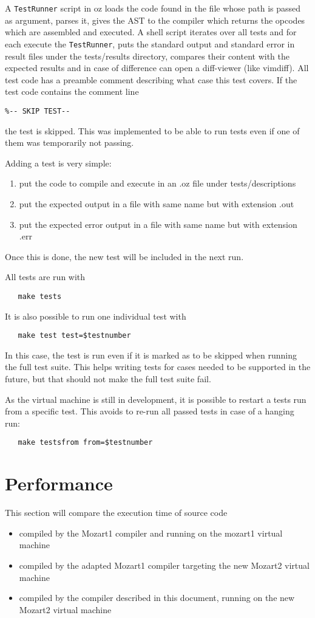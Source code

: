 \documentclass[a4paper]{memoir}
\begin{document}
A \lstinline!TestRunner! script in oz loads the code found in the file whose path is passed as argument, parses it, gives the AST to the compiler which returns the opcodes which are assembled and executed. 
A shell script iterates over all tests and for each execute the
\lstinline!TestRunner!, puts the standard output and standard error in result
files under the tests/results directory, compares their content with the
expected results and in case of difference can open a diff-viewer (like vimdiff).
All test code has a preamble comment describing what case this test covers.
If the test code contains the comment line
\begin{lstlisting}
%-- SKIP TEST-- 
\end{lstlisting}
the test is skipped. This was implemented to be able to run tests even if one of them was temporarily not passing.

Adding a test is very simple:
\begin{enumerate}
  \item put the code to compile and execute in an .oz file under tests/descriptions
  \item put the expected output in a file with same name but with extension .out
  \item put the expected error output in a file with same name but with extension .err
\end{enumerate}
Once this is done, the new test will be included in the next run.

All tests are run with 
\begin{lstlisting}
   make tests
\end{lstlisting}
It is also possible to run one individual test with
\begin{lstlisting}
   make test test=$testnumber
\end{lstlisting}
In this case, the test is run
even if it is marked as to be skipped when running the full test suite. This helps writing tests for cases needed to be supported in the future, but that should not make the full test suite fail.

As the virtual machine is still in development, it is possible to restart a
tests run from a specific test. This avoids to re-run all passed tests in case
of a hanging run:
\begin{lstlisting}
   make testsfrom from=$testnumber
\end{lstlisting}

\section{Performance}
This section will compare the execution time of source code
\begin{itemize}
  \item compiled by the Mozart1 compiler and running on the mozart1 virtual
    machine 
  \item compiled by the adapted Mozart1 compiler targeting the new Mozart2 virtual
    machine
  \item compiled by the compiler described in this document, running on the new
    Mozart2 virtual machine
\end{itemize}
\end{document}
